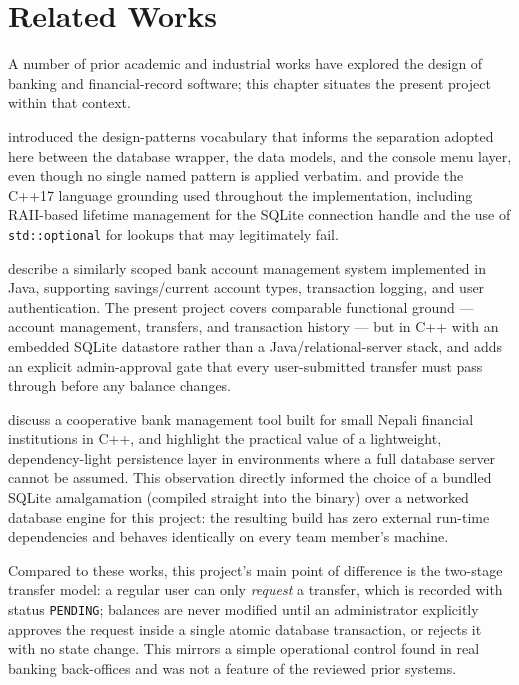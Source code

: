 \chapter{Related Works}

A number of prior academic and industrial works have explored the design of banking and financial-record software; this chapter situates the present project within that context.

\citet{gamma1994} introduced the design-patterns vocabulary that informs the separation adopted here between the database wrapper, the data models, and the console menu layer, even though no single named pattern is applied verbatim. \citet{stroustrup2013} and \citet{schildt2014} provide the C++17 language grounding used throughout the implementation, including RAII-based lifetime management for the SQLite connection handle and the use of \texttt{std::optional} for lookups that may legitimately fail.

\citet{singhverma2018} describe a similarly scoped bank account management system implemented in Java, supporting savings/current account types, transaction logging, and user authentication. The present project covers comparable functional ground --- account management, transfers, and transaction history --- but in C++ with an embedded SQLite datastore rather than a Java/relational-server stack, and adds an explicit admin-approval gate that every user-submitted transfer must pass through before any balance changes.

\citet{pandeykarmacharya2020} discuss a cooperative bank management tool built for small Nepali financial institutions in C++, and highlight the practical value of a lightweight, dependency-light persistence layer in environments where a full database server cannot be assumed. This observation directly informed the choice of a bundled SQLite amalgamation (compiled straight into the binary) over a networked database engine for this project: the resulting build has zero external run-time dependencies and behaves identically on every team member's machine.

Compared to these works, this project's main point of difference is the two-stage transfer model: a regular user can only \emph{request} a transfer, which is recorded with status \texttt{PENDING}; balances are never modified until an administrator explicitly approves the request inside a single atomic database transaction, or rejects it with no state change. This mirrors a simple operational control found in real banking back-offices and was not a feature of the reviewed prior systems.
